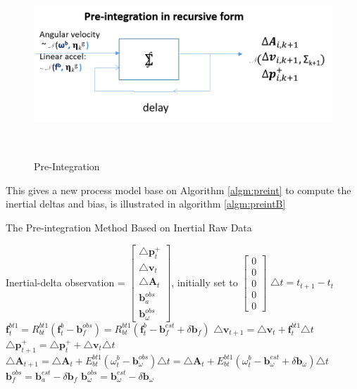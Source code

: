 \documentclass[12pt]{article}   %
\begin{document}
\begin{figure}[ht]
	\label{fig:preint}
	\includegraphics[height=7cm]{figures/Pre-integration_block-flow.png}
	\caption{Pre-Integration}
	\label{fig:preintBlock}
\end{figure}

This gives a new process model base on Algorithm \ref{algm:preint} to compute the inertial deltas and bias, is illustrated in algorithm \ref{algm:preintB}
\begin{algorithm}
	\caption{The Pre-integration Method Based on Inertial Raw Data}
	\label{algm:preintB}		
	\begin{algorithmic}
		\STATE Inertial-delta observation = $\begin{bmatrix} 
		\triangle \textbf{p}_{t}^+ \\
		\triangle \textbf{v}_{t} \\
		\triangle \textbf{A} _{t} \\
		\textbf{b}_a^{obs} \\
		\textbf{b}_{\omega}^{obs}
		\end{bmatrix}$, initially set to $\begin{bmatrix} 
		0 \\ 
		0 \\ 
		0 \\
		0 \\
		0
		\end{bmatrix}$
		\STATE $\triangle t =  t_{t+1} - t_t$ 
		\STATE $\textbf{f}_t^{bt1} = R_{bt}^{bt1} (\textbf{f}_t^b - \textbf{b}_f^{obs}) = R_{bt}^{bt1} (\textbf{f}_t^b - \textbf{b}_f^{est} + \delta \bm{b}_f)$ 
		\STATE $\triangle \textbf{v}_{t+1} = \triangle \textbf{v}_{t} + \textbf{f}_t^{bt1} \triangle t$ 
		\STATE $\triangle \textbf{p}_{t+1}^+ = \triangle \textbf{p}_{t}^+ + \triangle \textbf{v}_t \triangle t$ 
		\STATE $\triangle \textbf{A} _{t+1} = \triangle \textbf{A} _{t} + E_{bt}^{bt1} (\omega _t^b - \textbf{b}_\omega^{obs} ) \triangle t= \triangle \textbf{A} _{t} + E_{bt}^{bt1} (\omega _t^b - \textbf{b}_\omega^{est} +  \delta \bm{b}_{\omega}) \triangle t$ 
		\STATE $\textbf{b}_f^{obs} = \textbf{b}_a^{est} - \delta \bm{b}_f$
		\STATE $\textbf{b}_{\omega}^{obs} = \textbf{b}_{\omega}^{est} -  \delta \bm{b}_{\omega}$
		\ENDFOR
	\end{algorithmic}
\end{algorithm}
\end{document}
